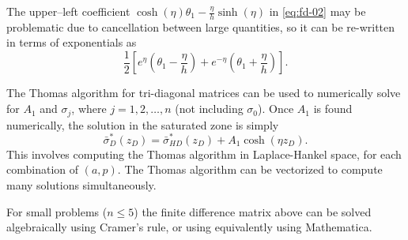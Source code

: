 \documentclass[12pt,letterpaper]{article}
\begin{document}
The upper--left coefficient $\cosh(\eta)\theta_1 - \frac{\eta}{h}\sinh(\eta)$ in
\eqref{eq:fd-02} may be problematic due to cancellation between large
quantities, so it can be re-written in terms of exponentials as 
\begin{equation}
 \nonumber
 \frac{1}{2} \left[ e^{\eta} \left( \theta_1 - \frac{\eta}{h}\right) + e^{-\eta}
   \left( \theta_1 + \frac{\eta}{h}\right) \right].
\end{equation}

The Thomas algorithm for tri-diagonal matrices can be used to
numerically solve for $A_1$ and $\sigma_j$, where $j=1,2, \dots, n$
(not including $\sigma_0$).  Once $A_1$ is found numerically, the
solution in the saturated zone is simply 
\begin{equation}
 \nonumber
 \bar{\sigma}^{\ast}_{D}(z_D) = \bar{\sigma}^{\ast}_{HD}(z_D) + A_1
 \cosh(\eta z_D).
\end{equation}
This involves computing the Thomas algorithm in Laplace-Hankel space,
for each combination of $(a,p)$.  The Thomas algorithm can be
vectorized to compute many solutions simultaneously.

For small problems ($n \le 5$) the finite difference matrix above can
be solved algebraically using Cramer's rule, or using equivalently
using Mathematica.  



\end{document}
